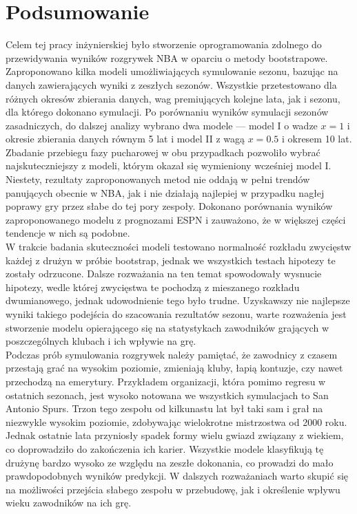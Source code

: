 \documentclass[inzynierska]{pwr_wmat_praca_dyplomowa}
\theoremstyle{plain}
\numberwithin{theorem}{chapter}
\theoremstyle{definition}
\numberwithin{theorem}{chapter}
\begin{document}
\chapter{Podsumowanie}
Celem tej pracy inżynierskiej było stworzenie oprogramowania zdolnego do przewidywania wyników rozgrywek NBA w oparciu o metody bootstrapowe.
Zaproponowano kilka modeli umożliwiających symulowanie sezonu, bazując na danych zawierających wyniki z zeszłych sezonów. Wszystkie przetestowano dla różnych okresów zbierania danych, wag premiujących kolejne lata, jak i sezonu, dla którego dokonano symulacji. Po porównaniu wyników symulacji sezonów zasadniczych, do dalszej analizy wybrano dwa modele --- model I o wadze $x=1$ i okresie zbierania danych równym 5 lat i model II z wagą $x=0.5$ i okresem 10 lat. Zbadanie przebiegu fazy pucharowej w obu przypadkach pozwoliło wybrać najskuteczniejszy z modeli, którym okazał się wymieniony wcześniej model I. Niestety, rezultaty zaproponowanych metod nie oddają w pełni trendów panujących obecnie w NBA, jak i nie działają najlepiej w przypadku nagłej poprawy gry przez słabe do tej pory zespoły. Dokonano porównania wyników zaproponowanego modelu z prognozami ESPN i zauważono, że w większej części tendencje w nich są podobne. \\
\hspace*{6mm}W trakcie badania skuteczności modeli testowano normalność rozkładu zwycięstw każdej z drużyn w próbie bootstrap, jednak we wszystkich testach hipotezy te zostały odrzucone. Dalsze rozważania na ten temat spowodowały wysnucie hipotezy, wedle której zwycięstwa te pochodzą z mieszanego rozkładu dwumianowego, jednak udowodnienie tego było trudne. Uzyskawszy nie najlepsze wyniki takiego podejścia do szacowania rezultatów sezonu, warte rozważenia jest stworzenie modelu opierającego się na statystykach zawodników grających w poszczególnych klubach i ich wpływie na grę.\\
\hspace*{6mm}Podczas prób symulowania rozgrywek należy pamiętać, że zawodnicy z czasem przestają grać na wysokim poziomie, zmieniają kluby, łapią kontuzje, czy nawet przechodzą na emerytury. Przykładem organizacji, która pomimo regresu w ostatnich sezonach, jest wysoko notowana we wszystkich symulacjach to San Antonio Spurs. Trzon tego zespołu od kilkunastu lat był taki sam i grał na niezwykle wysokim poziomie, zdobywając wielokrotne mistrzostwa od 2000 roku. Jednak ostatnie lata przyniosły spadek formy wielu gwiazd związany z wiekiem, co doprowadziło do zakończenia ich karier. Wszystkie modele klasyfikują tę drużynę bardzo wysoko ze względu na zeszłe dokonania, co prowadzi do mało prawdopodobnych wyników predykcji. W dalszych rozważaniach warto skupić się na możliwości przejścia słabego zespołu w przebudowę, jak i określenie wpływu wieku zawodników na ich grę. \\
\end{document}
